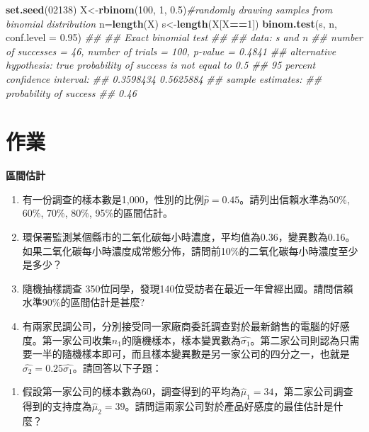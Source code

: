 \documentclass[hyperref,]{ctexart}
\newenvironment{Shaded}{\begin{snugshade}}{\end{snugshade}}
\newcommand{\CommentTok}[1]{\textcolor[rgb]{0.56,0.35,0.01}{\textit{#1}}}
\newcommand{\DataTypeTok}[1]{\textcolor[rgb]{0.13,0.29,0.53}{#1}}
\newcommand{\DecValTok}[1]{\textcolor[rgb]{0.00,0.00,0.81}{#1}}
\newcommand{\FloatTok}[1]{\textcolor[rgb]{0.00,0.00,0.81}{#1}}
\newcommand{\KeywordTok}[1]{\textcolor[rgb]{0.13,0.29,0.53}{\textbf{#1}}}
\newcommand{\NormalTok}[1]{#1}
\newcommand{\OperatorTok}[1]{\textcolor[rgb]{0.81,0.36,0.00}{\textbf{#1}}}
\providecommand{\tightlist}{%
  \setlength{\itemsep}{0pt}\setlength{\parskip}{0pt}}
\begin{document}
\begin{Shaded}
\begin{Highlighting}[]
\KeywordTok{set.seed}\NormalTok{(}\DecValTok{02138}\NormalTok{)}
\NormalTok{X<-}\KeywordTok{rbinom}\NormalTok{(}\DecValTok{100}\NormalTok{, }\DecValTok{1}\NormalTok{, }\FloatTok{0.5}\NormalTok{)}\CommentTok{#randomly drawing samples from binomial distribution}
\NormalTok{n=}\KeywordTok{length}\NormalTok{(X)}
\NormalTok{s<-}\KeywordTok{length}\NormalTok{(X[X}\OperatorTok{==}\DecValTok{1}\NormalTok{])}
\KeywordTok{binom.test}\NormalTok{(s, n, }\DataTypeTok{conf.level =} \FloatTok{0.95}\NormalTok{)}
\CommentTok{## }
\CommentTok{##  Exact binomial test}
\CommentTok{## }
\CommentTok{## data:  s and n}
\CommentTok{## number of successes = 46, number of trials = 100, p-value = 0.4841}
\CommentTok{## alternative hypothesis: true probability of success is not equal to 0.5}
\CommentTok{## 95 percent confidence interval:}
\CommentTok{##  0.3598434 0.5625884}
\CommentTok{## sample estimates:}
\CommentTok{## probability of success }
\CommentTok{##                   0.46}
\end{Highlighting}
\end{Shaded}

\hypertarget{ux4f5cux696d}{%
\section{作業}\label{ux4f5cux696d}}

\textbf{區間估計}

\begin{enumerate}
\def\labelenumi{\arabic{enumi}.}
\item
  有一份調查的樣本數是1,000，性別的比例\(\hat{p}=0.45\)。請列出信賴水準為50\%,
  60\%, 70\%, 80\%, 95\%的區間估計。
\item
  環保署監測某個縣市的二氧化碳每小時濃度，平均值為0.36，變異數為0.16。如果二氧化碳每小時濃度成常態分佈，請問前10\%的二氧化碳每小時濃度至少是多少？
\item
  隨機抽樣調查
  350位同學，發現140位受訪者在最近一年曾經出國。請問信賴水準90\%的區間估計是甚麼?
\item
  有兩家民調公司，分別接受同一家廠商委託調查對於最新銷售的電腦的好感度。第一家公司收集\(n_{1}\)的隨機樣本，樣本變異數為\(\hat{\sigma_{1}}\)。第二家公司則認為只需要一半的隨機樣本即可，而且樣本變異數是另一家公司的四分之一，也就是\(\hat{\sigma_{2}}=0.25\hat{\sigma_{1}}\)。請回答以下子題：
\end{enumerate}

\begin{enumerate}
\def\labelenumi{(\arabic{enumi})}
\tightlist
\item
  假設第一家公司的樣本數為60，調查得到的平均為\(\hat{\mu}_{1}=34\)，第二家公司調查得到的支持度為\(\hat{\mu}_{2}=39\)。請問這兩家公司對於產品好感度的最佳估計是什麼？
\end{enumerate}
\end{document}

